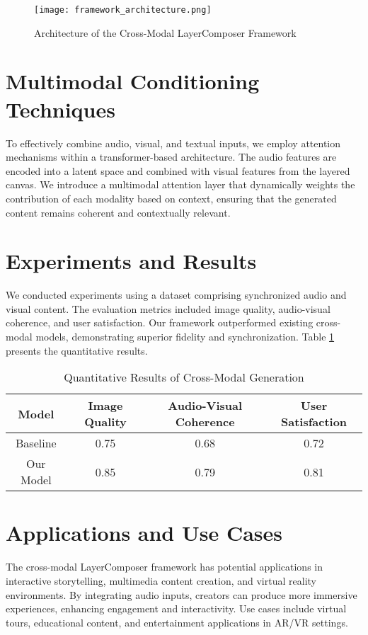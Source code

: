 \documentclass{article}
\begin{document}
\begin{figure}[h]
\centering
\texttt{[image: framework\_architecture.png]}
\caption{Architecture of the Cross-Modal LayerComposer Framework}
\label{fig:architecture}
\end{figure}

\section{Multimodal Conditioning Techniques}
To effectively combine audio, visual, and textual inputs, we employ attention mechanisms within a transformer-based architecture. The audio features are encoded into a latent space and combined with visual features from the layered canvas. We introduce a multimodal attention layer that dynamically weights the contribution of each modality based on context, ensuring that the generated content remains coherent and contextually relevant.

\section{Experiments and Results}
We conducted experiments using a dataset comprising synchronized audio and visual content. The evaluation metrics included image quality, audio-visual coherence, and user satisfaction. Our framework outperformed existing cross-modal models, demonstrating superior fidelity and synchronization. Table \ref{tab:results} presents the quantitative results.

\begin{table}[h]
\centering
\begin{tabular}{|c|c|c|c|}
\hline
Model & Image Quality & Audio-Visual Coherence & User Satisfaction \\
\hline
Baseline & 0.75 & 0.68 & 0.72 \\
Our Model & 0.85 & 0.79 & 0.81 \\
\hline
\end{tabular}
\caption{Quantitative Results of Cross-Modal Generation}
\label{tab:results}
\end{table}

\section{Applications and Use Cases}
The cross-modal LayerComposer framework has potential applications in interactive storytelling, multimedia content creation, and virtual reality environments. By integrating audio inputs, creators can produce more immersive experiences, enhancing engagement and interactivity. Use cases include virtual tours, educational content, and entertainment applications in AR/VR settings.
\end{document}
